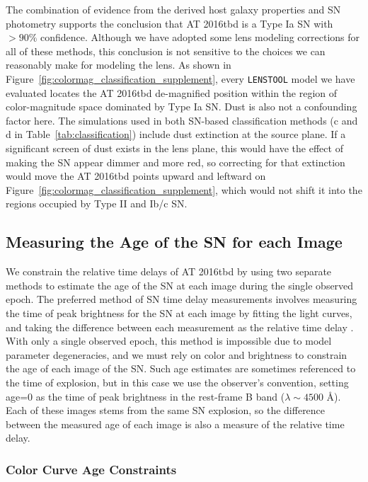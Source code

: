 \documentclass[12pt]{article}
\def\SNABC{AT 2016tbd\xspace}
\def\lenstool{{\tt LENSTOOL}\xspace}
\begin{document}
The combination of evidence from the derived host galaxy properties  and SN photometry supports the conclusion that \SNABC  is  a Type Ia SN with $>90\%$ confidence.  Although we have adopted some lens modeling corrections for all of these methods, this conclusion is not sensitive to the choices we can reasonably make for modeling the lens.  As shown in Figure~\ref{fig:colormag_classification_supplement}, every  \lenstool model we have evaluated locates the \SNABC  de-magnified position within the region of color-magnitude space dominated by Type Ia SN. Dust is also not a confounding factor here. 
The simulations used in both SN-based classification methods (c and d in Table~\ref{tab:classification}) include dust extinction at the source plane.  If a significant screen of dust exists in the lens plane, this would have the effect of making the SN appear dimmer and more red, so correcting for that extinction would move the \SNABC points upward and leftward on Figure~\ref{fig:colormag_classification_supplement}, which would not shift it into the regions occupied by Type II and Ib/c SN. 


\subsection*{Measuring the Age of the SN for each Image}
We constrain the relative time delays of \SNABC by using two separate methods to estimate the age of the SN at each image during the single observed epoch. The preferred method of SN time delay measurements involves measuring the time of peak brightness for the SN at each image by fitting the light curves, and taking the difference between each measurement as the relative time delay \cite{pierel_turning_2019,dhawan_magnification_2019,huber_strongly_2019}. With only a single observed epoch, this method is impossible due to model parameter degeneracies, and we must rely on color and brightness to constrain the age of each image of the SN. Such age estimates are sometimes referenced to the time of explosion, but in this case we use the observer's convention, setting age=0 as the time of peak brightness in the rest-frame B band ($\lambda\sim4500$ \AA).  Each of these images stems from the same SN explosion, so the difference between the measured age of each image is also a measure of the relative time delay. 

\subsubsection*{Color Curve Age Constraints}
\end{document}
